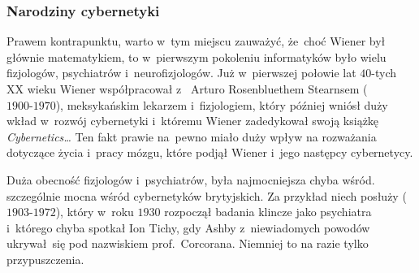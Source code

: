 \documentclass[10pt,t]{beamer}
\begin{document}
\begin{frame}
  \frametitle{Narodziny cybernetyki}




  Prawem kontrapunktu, warto w~tym miejscu zauważyć, że~choć Wiener był
  głównie matematykiem, to w~pierwszym pokoleniu informatyków było wielu
  fizjologów, psychiatrów i~neurofizjologów. Już w~pierwszej połowie lat
  $40$-tych XX wieku Wiener współpracował
  z~
  {Arturo Rosenbluethem Stearnsem} ($1900\text{-}1970$), meksykańskim
  lekarzem i~fizjologiem, który później wniósł duży wkład w~rozwój
  cybernetyki i~któremu Wiener zadedykował swoją książkę
  \textit{Cybernetics\ldots} Ten fakt prawie na~pewno miało duży wpływ na
  rozważania dotyczące życia i~pracy mózgu, które podjął Wiener i~jego
  następcy cybernetycy.

  Duża obecność fizjologów i~psychiatrów, była najmocniejsza chyba wśród.
  szczególnie mocna wśród cybernetyków brytyjskich. Za przykład niech
  posłuży  ($1903\text{-}1972$), który w~roku $1930$ rozpoczął badania
  klincze jako psychiatra i~którego chyba spotkał Ion Tichy, gdy Ashby
  z~niewiadomych powodów ukrywał~się pod nazwiskiem
  prof.~Corcorana. Niemniej to na razie tylko przypuszczenia.

\end{frame}
\end{document}
